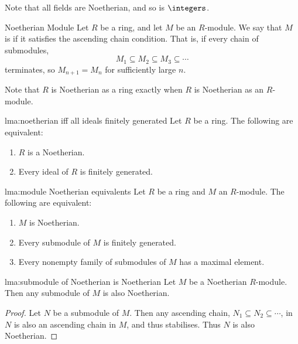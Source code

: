 Note that all fields are Noetherian, and so is \(\integers\).

\begin{dfn}{Noetherian Module}{}
    Let \(R\) be a ring, and let \(M\) be an \(R\)-module.
    We say that \(M\) is  if it satisfies the ascending chain condition.
    That is, if every chain of submodules,
    \begin{equation}
        M_1 \subseteq M_2 \subseteq M_3 \subseteq \dotsb
    \end{equation}
    terminates, so \(M_{n+1} = M_n\) for sufficiently large \(n\).
\end{dfn}

Note that \(R\) is Noetherian as a ring exactly when \(R\) is Noetherian as an \(R\)-module.

\begin{lma}{}{lma:noetherian iff all ideals finitely generated}
    Let \(R\) be a ring.
    The following are equivalent:
    \begin{enumerate}
        \item \(R\) is a Noetherian.
        \item Every ideal of \(R\) is finitely generated.
    \end{enumerate}
\end{lma}

\begin{lma}{}{lma:module Noetherian equivalents}
    Let \(R\) be a ring and \(M\) an \(R\)-module.
    The following are equivalent:
    \begin{enumerate}
        \item \(M\) is Noetherian.
        \item Every submodule of \(M\) is finitely generated.
        \item \label{itm:module noetherian if maximal submodule exists}Every nonempty family of submodules of \(M\) has a maximal element.
    \end{enumerate}
\end{lma}

\begin{lma}{}{lma:submodule of Noetherian is Noetherian}
    Let \(M\) be a Noetherian \(R\)-module.
    Then any submodule of \(M\) is also Noetherian.
    \begin{proof}
        Let \(N\) be a submodule of \(M\).
        Then any ascending chain, \(N_1 \subseteq N_2 \subseteq \dotsb\), in \(N\) is also an ascending chain in \(M\), and thus stabilises.
        Thus \(N\) is also Noetherian.
    \end{proof}
\end{lma}

